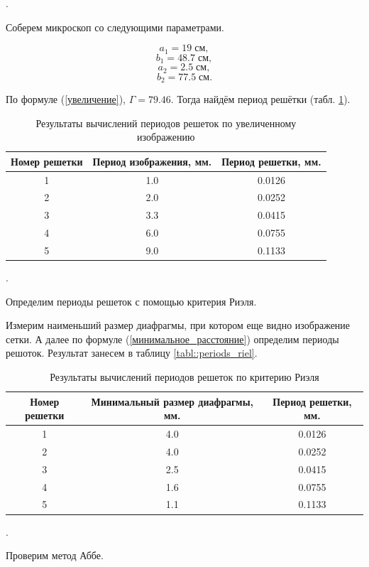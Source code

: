 \documentclass[a4paper, 12pt]{article}
\newcounter{Points}
\newcommand{\point}{\arabic{Points}. \addtocounter{Points}{1}}
\begin{document}
\point Соберем микроскоп со следующими параметрами. 

\[a_1 = 19      \; см,\]
\[b_1 = 48.7    \; см,\]
\[a_2 = 2.5     \; см,\]
\[b_2 = 77.5    \; см.\]

По формуле (\ref{увеличение}), $ \Gamma = 79.46$. Тогда найдём период решётки (табл. \ref{tabl:periods_microscope}).

\begin{table}[h]
\centering
\begin{tabular}{|c|c|c|}
\hline 
    Номер решетки & Период изображения, мм. & Период решетки, мм. \\ \hline
    1 & 1.0 & 0.0126 \\ \hline
    2 & 2.0 & 0.0252 \\ \hline
    3 & 3.3 & 0.0415 \\ \hline
    4 & 6.0 & 0.0755 \\ \hline
    5 & 9.0 & 0.1133 \\ \hline

\end{tabular}
\caption{Результаты вычислений периодов решеток по увеличенному изображению}
\label{tabl:periods_microscope}
\end{table}

\point Определим периоды решеток с помощью критерия Риэля.

Измерим наименьший размер диафрагмы, при котором еще видно изображение сетки. А далее по формуле (\ref{минимальное_расстояние}) определим периоды решоток. Результат занесем в таблицу \ref{tabl::periods_riel}.

\begin{table}[h]
\centering
\begin{tabular}{|c|c|c|}
\hline 
Номер решетки & Минимальный размер диафрагмы, мм. & Период решетки, мм. \\ \hline
1 & 4.0 & 0.0126 \\ \hline
2 & 4.0 & 0.0252 \\ \hline
3 & 2.5 & 0.0415 \\ \hline
4 & 1.6 & 0.0755 \\ \hline
5 & 1.1 & 0.1133 \\ \hline

\end{tabular}
\caption{Результаты вычислений периодов решеток по критерию Риэля}
\label{tabl:periods_riel}
\end{table}

\point Проверим метод Аббе.
\end{document}
